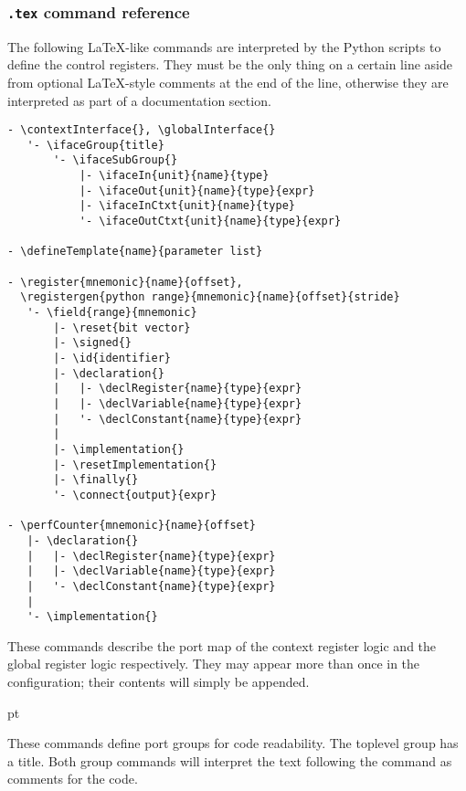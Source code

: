 
\subsubsection[.tex command reference]{\texttt{.tex} command reference}
\label{sec:core-ug-cfg-cregs-cref}

The following LaTeX-like commands are interpreted by the Python scripts to 
define the control registers. They must be the only thing on a certain line 
aside from optional LaTeX-style comments at the end of the line, otherwise they 
are interpreted as part of a documentation section.

\begin{lstlisting}[numbers=none, language=nothing]
- \contextInterface{}, \globalInterface{}
   '- \ifaceGroup{title}
       '- \ifaceSubGroup{}
           |- \ifaceIn{unit}{name}{type}
           |- \ifaceOut{unit}{name}{type}{expr}
           |- \ifaceInCtxt{unit}{name}{type}
           '- \ifaceOutCtxt{unit}{name}{type}{expr}
           
- \defineTemplate{name}{parameter list}

- \register{mnemonic}{name}{offset},
  \registergen{python range}{mnemonic}{name}{offset}{stride}
   '- \field{range}{mnemonic}
       |- \reset{bit vector}
       |- \signed{}
       |- \id{identifier}
       |- \declaration{}
       |   |- \declRegister{name}{type}{expr}
       |   |- \declVariable{name}{type}{expr}
       |   '- \declConstant{name}{type}{expr}
       |
       |- \implementation{}
       |- \resetImplementation{}
       |- \finally{}
       '- \connect{output}{expr}
       
- \perfCounter{mnemonic}{name}{offset}
   |- \declaration{}
   |   |- \declRegister{name}{type}{expr}
   |   |- \declVariable{name}{type}{expr}
   |   '- \declConstant{name}{type}{expr}
   |
   '- \implementation{}
\end{lstlisting}


\codehead{\contextInterface{}}

\codehead{\globalInterface{}}

\noindent These commands describe the port map of the context register logic and 
the global register logic respectively. They may appear more than once in the 
configuration; their contents will simply be appended.

 pt

\codehead{\ifaceSubGroup{}}

\noindent These commands define port groups for code readability. The toplevel 
group has a title. Both group commands will interpret the text following the 
command as comments for the code.

